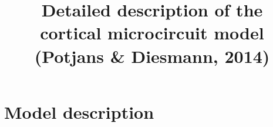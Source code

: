 \documentclass[10pt,a4paper,twoside,american]{article}
\theoremstyle{definitionstyle}
\begin{document}
\title{Detailed description of the \\ cortical microcircuit model (Potjans \& Diesmann, 2014)}
\author{}
\date{}
\maketitle
\thispagestyle{empty}

\def\marg{1ex}
\setlength{\parindent}{0pt}

\tableofcontents
\clearpage
\section{Model description}
\label{sec:model_description}
\end{document}
